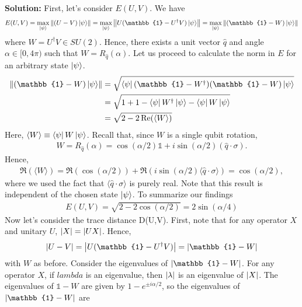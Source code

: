 \documentclass{book}
\begin{document}
    \textbf{Solution:} First, let's consider $E(U,V)$. We have
    \begin{align}
        E(U,V) = \max_{\ket{\psi}} \norm{(U-V)\ket{\psi}} = \max_{\ket{\psi}} \norm{U(\mathbb{1}-U^\dagger V)\ket{\psi}} = \max_{\ket{\psi}} \norm{(\mathbb{1}-W)\ket{\psi}} 
    \end{align}
    where $W = U^\dagger V \in SU(2)$. Hence, there exists a unit vector $\hat{q}$ and angle $\alpha\in [0,4\pi)$ such that $W = R_{\hat{q}}(\alpha)$. Let us proceed to calculate the norm in $E$ for an arbitrary state $\ket{\psi}$.
    \begin{align}
    \begin{aligned}
        \norm{(\mathbb{1}-W)\ket{\psi}} &= \sqrt{\bra{\psi}(\mathbb{1}-W^\dagger)(\mathbb{1}-W)\ket{\psi}} \\
        &= \sqrt{1 + 1 - \bra{\psi}W^\dagger \ket{\psi} - \bra{\psi}W\ket{\psi}} \\
        &= \sqrt{2-2 \Re(\langle W\rangle)}
    \end{aligned}
    \end{align}
    Here, $\langle W \rangle \equiv \bra{\psi} W \ket{\psi}$. Recall that, since $W$ is a single qubit rotation,
    \begin{align}
        W = R_{\hat{q}}(\alpha) = \cos(\alpha/2)\mathbb{1} + i \sin(\alpha/2) (\hat{q}\cdot \sigma).
    \end{align}
    Hence,
    \begin{align}
        \Re(\langle W \rangle) = \Re(\cos(\alpha /2)) + \Re(i \sin(\alpha/2) \langle \hat{q}\cdot \sigma \rangle) = \cos(\alpha/2),
    \end{align}
    where we used the fact that $\langle \hat{q}\cdot \sigma \rangle$ is purely real. Note that this result is independent of the chosen state $\ket{\psi}$. To summarize our findings
    \begin{align} \label{eq:ExerciseA3.1 E(U,V) result}
        E(U,V) = \sqrt{2 - 2 \cos(\alpha/2)} = 2 \sin (\alpha/4)
    \end{align}
    Now let's consider the trace distance D(U,V). First, note that for any operator $X$ and unitary $U$, $\abs{X} = \abs{UX}$. Hence,
    \begin{align}
        \abs{U-V} = \abs{U(\mathbb{1}-U^\dagger V)} = \abs{\mathbb{1}- W}
    \end{align}
    with $W$ as before. Consider the eigenvalues of $\abs{\mathbb{1}- W}$. For any operator $X$, if $lambda$ is an eigenvalue, then $\abs{\lambda}$ is an eigenvalue of $\abs{X}$. The eigenvalues of $\mathbb{1}-W$ are given by $1 - e^{\pm i\alpha/2}$, so the eigenvalues of $\abs{\mathbb{1}- W}$ are
\end{document}

